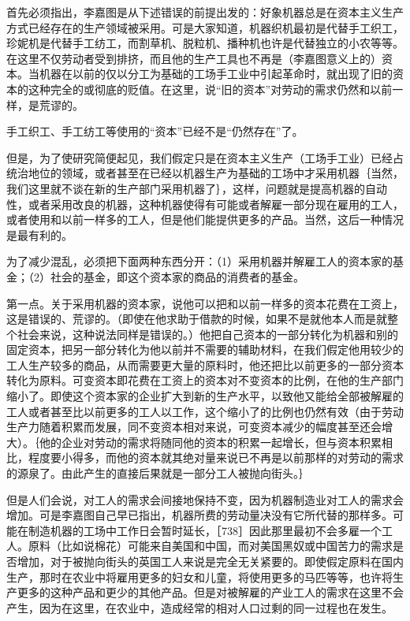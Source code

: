 首先必须指出，李嘉图是从下述错误的前提出发的：好象机器总是在资本主义生产方式已经存在的生产领域被采用。可是大家知道，机器织机最初是代替手工织工，珍妮机是代替手工纺工，而割草机、脱粒机、播种机也许是代替独立的小农等等。在这里不仅劳动者受到排挤，而且他的生产工具也不再是（李嘉图意义上的）资本。当机器在以前的仅以分工为基础的工场手工业中引起革命时，就出现了旧的资本的这种完全的或彻底的贬值。在这里，说“旧的资本”对劳动的需求仍然和以前一样，是荒谬的。

手工织工、手工纺工等使用的“资本”已经不是“仍然存在”了。

但是，为了使研究简便起见，我们假定只是在资本主义生产（工场手工业）已经占统治地位的领域，或者甚至在已经以机器生产为基础的工场中才采用机器｛当然，我们这里就不谈在新的生产部门采用机器了｝，这样，问题就是提高机器的自动性，或者采用改良的机器，这种机器使得有可能或者解雇一部分现在雇用的工人，或者使用和以前一样多的工人，但是他们能提供更多的产品。当然，这后一种情况是最有利的。

为了减少混乱，必须把下面两种东西分开：（1）采用机器并解雇工人的资本家的基金；（2）社会的基金，即这个资本家的商品的消费者的基金。

第一点。关于采用机器的资本家，说他可以把和以前一样多的资本花费在工资上，这是错误的、荒谬的。（即使在他求助于借款的时候，如果不是就他本人而是就整个社会来说，这种说法同样是错误的。）他把自己资本的一部分转化为机器和别的固定资本，把另一部分转化为他以前并不需要的辅助材料，在我们假定他用较少的工人生产较多的商品，从而需要更大量的原料时，他还把比以前更多的一部分资本转化为原料。可变资本即花费在工资上的资本对不变资本的比例，在他的生产部门缩小了。即使这个资本家的企业扩大到新的生产水平，以致他又能给全部被解雇的工人或者甚至比以前更多的工人以工作，这个缩小了的比例也仍然有效（由于劳动生产力随着积累而发展，同不变资本相对来说，可变资本减少的幅度甚至还会增大）。｛他的企业对劳动的需求将随同他的资本的积累一起增长，但与资本积累相比，程度要小得多，而他的资本就其绝对量来说已不再是以前那样的对劳动的需求的源泉了。由此产生的直接后果就是一部分工人被抛向街头。｝

但是人们会说，对工人的需求会间接地保持不变，因为机器制造业对工人的需求会增加。可是李嘉图自己早已指出，机器所费的劳动量决没有它所代替的那样多。可能在制造机器的工场中工作日会暂时延长，［738］因此那里最初不会多雇一个工人。原料（比如说棉花）可能来自美国和中国，而对美国黑奴或中国苦力的需求是否增加，对于被抛向街头的英国工人来说是完全无关紧要的。即使假定原料在国内生产，那时在农业中将雇用更多的妇女和儿童，将使用更多的马匹等等，也许将生产更多的这种产品和更少的其他产品。但是对被解雇的产业工人的需求在这里不会产生，因为在这里，在农业中，造成经常的相对人口过剩的同一过程也在发生。

